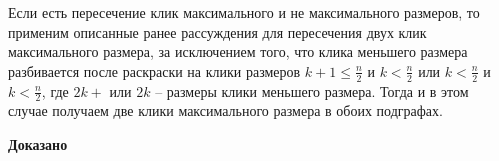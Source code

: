 \documentclass[a4paper,14pt]{article} %
\begin{document}
Если есть пересечение клик максимального и не максимального размеров, то применим описанные ранее рассуждения для пересечения двух клик максимального размера, за исключением того, что клика меньшего размера разбивается после раскраски на клики размеров $k+1 \leqslant \frac{n}{2}$ и $k < \frac{n}{2}$ или $k < \frac{n}{2}$ и $k < \frac{n}{2}$, где $2k+$ или $2k$ -- размеры клики меньшего размера. Тогда и в этом случае получаем две клики максимального размера в обоих подграфах.

\begin{flushright}
\begin{large}
\textbf {Доказано}
\end{large}
\end{flushright}
\end{document}
